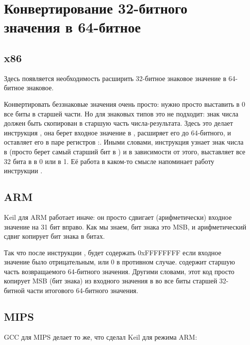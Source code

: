 ﻿\section{Конвертирование 32-битного значения в 64-битное}
\label{subsec:sign_extending_32_to_64}



\subsection{x86}



Здесь появляется необходимость расширить 32-битное знаковое значение в 64-битное знаковое.

Конвертировать беззнаковые значения очень просто: нужно просто выставить в 0 все биты в старшей части.
Но для знаковых типов это не подходит: знак числа должен быть скопирован в старшую часть числа-результата.
Здесь это делает инструкция , она берет входное значение в \EAX{}, расширяет его до 64-битного,
и оставляет его в паре регистров \EDX{}:\EAX{}.
Иными словами, инструкция  узнает знак числа в \EAX{} (просто берет самый старший бит в \EAX{}) и в зависимости от этого,
выставляет все 32 бита в \EDX{} в 0 или в 1.
Её работа в каком-то смысле напоминает работу инструкции \MOVSX{}.

\ifdefined\IncludeARM
\subsection{ARM}



Keil для ARM работает иначе: он просто сдвигает (арифметически) входное значение на 31 бит вправо.
Как мы знаем, бит знака это \ac{MSB}, и арифметический сдвиг копирует бит знака в  битах.

Так что после инструкции ,  будет содержать 0xFFFFFFFF если входное значение
было отрицательным, или 0 в противном случае.
 содержит старшую часть возвращаемого 64-битного значения.
Другими словами, этот код просто копирует \ac{MSB} (бит знака) из входного значения в  во все
биты старшей 32-битной части итогового 64-битного значения.

\fi

\ifdefined\IncludeMIPS
\subsection{MIPS}

\ifdefined\IncludeGCC

GCC для MIPS делает то же, что сделал Keil для режима ARM:


\fi

\fi

